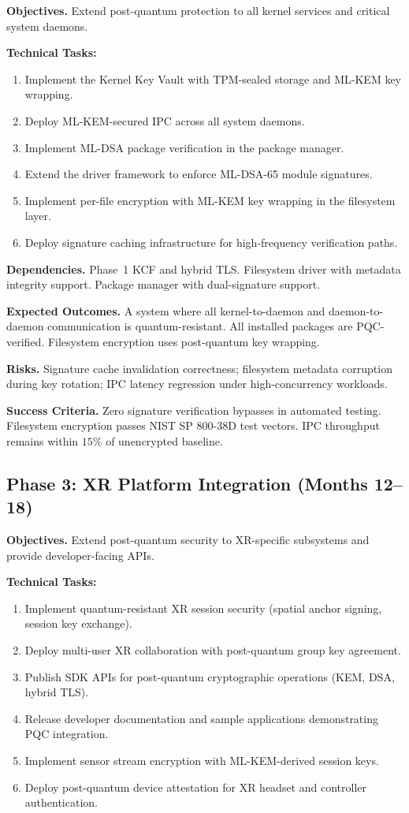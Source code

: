 \documentclass[11pt, a4paper]{article}
\begin{document}
\textbf{Objectives.} Extend post-quantum protection to all kernel services and critical system daemons.

\textbf{Technical Tasks:}
\begin{enumerate}
    \item Implement the Kernel Key Vault with TPM-sealed storage and ML-KEM key wrapping.
    \item Deploy ML-KEM-secured IPC across all system daemons.
    \item Implement ML-DSA package verification in the package manager.
    \item Extend the driver framework to enforce ML-DSA-65 module signatures.
    \item Implement per-file encryption with ML-KEM key wrapping in the filesystem layer.
    \item Deploy signature caching infrastructure for high-frequency verification paths.
\end{enumerate}

\textbf{Dependencies.} Phase~1 KCF and hybrid TLS. Filesystem driver with metadata integrity support. Package manager with dual-signature support.

\textbf{Expected Outcomes.} A system where all kernel-to-daemon and daemon-to-daemon communication is quantum-resistant. All installed packages are PQC-verified. Filesystem encryption uses post-quantum key wrapping.

\textbf{Risks.} Signature cache invalidation correctness; filesystem metadata corruption during key rotation; IPC latency regression under high-concurrency workloads.

\textbf{Success Criteria.} Zero signature verification bypasses in automated testing. Filesystem encryption passes NIST SP 800-38D test vectors. IPC throughput remains within $15\%$ of unencrypted baseline.

\subsection{Phase 3: XR Platform Integration (Months 12--18)}\label{sec:phase3}

\textbf{Objectives.} Extend post-quantum security to XR-specific subsystems and provide developer-facing APIs.

\textbf{Technical Tasks:}
\begin{enumerate}
    \item Implement quantum-resistant XR session security (spatial anchor signing, session key exchange).
    \item Deploy multi-user XR collaboration with post-quantum group key agreement.
    \item Publish SDK APIs for post-quantum cryptographic operations (KEM, DSA, hybrid TLS).
    \item Release developer documentation and sample applications demonstrating PQC integration.
    \item Implement sensor stream encryption with ML-KEM-derived session keys.
    \item Deploy post-quantum device attestation for XR headset and controller authentication.
\end{enumerate}
\end{document}
